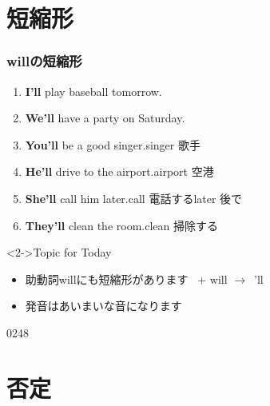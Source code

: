 \documentclass[aspectratio=169,xcolor={dvipsnames,table}]{beamer}
\newcommand{\myaudio}[1]{\href{#1}{\faVolumeUp}}
\begin{document}
\section{短縮形}
\begin{frame}[plain]\frametitle{willの短縮形}

\begin{enumerate}
 \item {\bfseries I'll} play baseball tomorrow.
 \item {\bfseries We'll} have a party on Saturday.
 \item {\bfseries You'll} be a  good singer.\hfill{\scriptsize singer  歌手}
 \item {\bfseries He'll} drive to the airport.\hfill{\scriptsize airport  空港}
 \item {\bfseries She'll} call him later.\hfill{\scriptsize call  電話する\hspace{8pt}later  後で}
 \item {\bfseries They'll} clean the room.\hfill{\scriptsize clean  掃除する}
\end{enumerate}

\vfill

\begin{block}<2->{Topic for Today}
\begin{itemize}[square]\small
 \item  助動詞willにも短縮形があります\
\hfill{} $+$ will $\longrightarrow$ \,'ll\hfill\mbox{}

 \item 発音はあいまいな音になります%
 \end{itemize}
     \end{block}

\mbox{}\hfill{\tiny 0248}\,{\scriptsize \myaudio{./audio/012_will_03a.mp3}}
\end{frame}
\section{否定}
\end{document}
